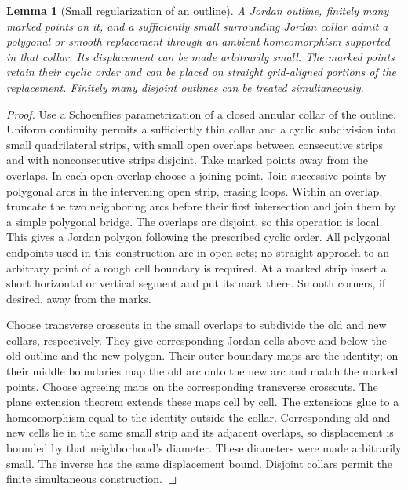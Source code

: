 \documentclass[11pt]{article}
\newtheorem{lemma}[theorem]{Lemma}
\theoremstyle{definition}
\theoremstyle{remark}
\numberwithin{equation}{section}
\begin{document}
\begin{lemma}[Small regularization of an outline]
\label{if:regularization}
A Jordan outline, finitely many marked points on it, and a sufficiently
small surrounding Jordan collar admit a polygonal or smooth replacement
through an ambient homeomorphism supported in that collar.  Its
displacement can be made arbitrarily small.  The marked points retain
their cyclic order and can be placed on straight grid-aligned portions
of the replacement.  Finitely many disjoint outlines can be treated
simultaneously.
\end{lemma}

\begin{proof}
Use a Schoenflies parametrization of a closed annular collar of the
outline.  Uniform continuity permits a sufficiently thin collar and
a cyclic subdivision into small quadrilateral strips, with small
open overlaps between consecutive strips and with nonconsecutive
strips disjoint.  Take marked points away from the overlaps.  In
each open overlap choose a joining point.  Join successive points
by polygonal arcs in the intervening open strip, erasing loops.
Within an overlap, truncate the two neighboring arcs before their
first intersection and join them by a simple polygonal bridge.
The overlaps are disjoint, so this operation is local.  This gives
a Jordan polygon following the prescribed cyclic order.  All
polygonal endpoints used in this construction are in open sets;
no straight approach to an arbitrary point of a rough cell boundary
is required.  At a marked strip insert a short horizontal or
vertical segment and put its mark there.  Smooth corners, if
desired, away from the marks.

Choose transverse crosscuts in the small overlaps to subdivide the
old and new collars, respectively.  They give corresponding Jordan
cells above and below the old outline and the new polygon.  Their
outer boundary maps are the identity; on their middle boundaries
map the old arc onto the new arc and match the marked points.
Choose agreeing maps on the corresponding transverse crosscuts.
The plane extension theorem extends these maps cell by cell.
The extensions glue to a homeomorphism equal to the identity outside
the collar.  Corresponding old and new cells lie in the same small
strip and its adjacent overlaps, so displacement is bounded by
that neighborhood's diameter.  These diameters were made arbitrarily
small.  The inverse has the same displacement bound.  Disjoint
collars permit the finite simultaneous construction.
\end{proof}
\end{document}
